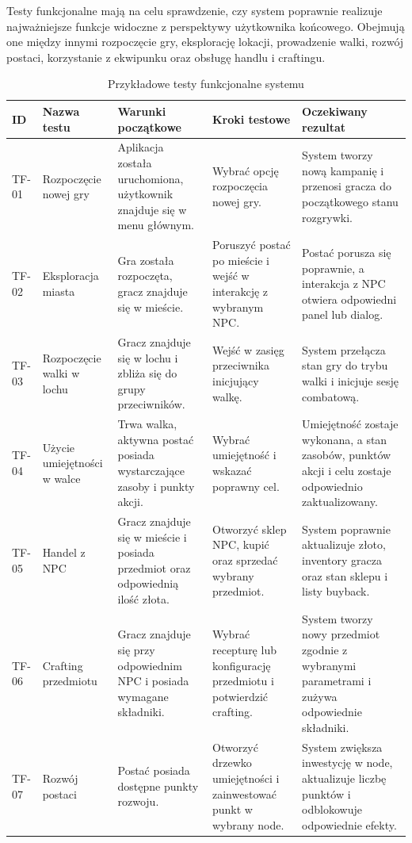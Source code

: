 Testy funkcjonalne mają na celu sprawdzenie, czy system poprawnie realizuje najważniejsze funkcje widoczne z perspektywy użytkownika końcowego. Obejmują one między innymi rozpoczęcie gry, eksplorację lokacji, prowadzenie walki, rozwój postaci, korzystanie z ekwipunku oraz obsługę handlu i craftingu.

\begin{table}[H]
\centering
\caption{Przykładowe testy funkcjonalne systemu}
\label{tab:testy-funkcjonalne}
\begin{threeparttable}
\begin{tabularx}{\linewidth}{|p{1.6cm}|p{3.2cm}|X|X|X|}
\hline
\textbf{ID} & \textbf{Nazwa testu} & \textbf{Warunki początkowe} & \textbf{Kroki testowe} & \textbf{Oczekiwany rezultat} \\
\hline
TF-01 & Rozpoczęcie nowej gry & Aplikacja została uruchomiona, użytkownik znajduje się w menu głównym. & Wybrać opcję rozpoczęcia nowej gry. & System tworzy nową kampanię i przenosi gracza do początkowego stanu rozgrywki. \\
\hline
TF-02 & Eksploracja miasta & Gra została rozpoczęta, gracz znajduje się w mieście. & Poruszyć postać po mieście i wejść w interakcję z wybranym NPC. & Postać porusza się poprawnie, a interakcja z NPC otwiera odpowiedni panel lub dialog. \\
\hline
TF-03 & Rozpoczęcie walki w lochu & Gracz znajduje się w lochu i zbliża się do grupy przeciwników. & Wejść w zasięg przeciwnika inicjujący walkę. & System przełącza stan gry do trybu walki i inicjuje sesję combatową. \\
\hline
TF-04 & Użycie umiejętności w walce & Trwa walka, aktywna postać posiada wystarczające zasoby i punkty akcji. & Wybrać umiejętność i wskazać poprawny cel. & Umiejętność zostaje wykonana, a stan zasobów, punktów akcji i celu zostaje odpowiednio zaktualizowany. \\
\hline
TF-05 & Handel z NPC & Gracz znajduje się w mieście i posiada przedmiot oraz odpowiednią ilość złota. & Otworzyć sklep NPC, kupić oraz sprzedać wybrany przedmiot. & System poprawnie aktualizuje złoto, inventory gracza oraz stan sklepu i listy buyback. \\
\hline
TF-06 & Crafting przedmiotu & Gracz znajduje się przy odpowiednim NPC i posiada wymagane składniki. & Wybrać recepturę lub konfigurację przedmiotu i potwierdzić crafting. & System tworzy nowy przedmiot zgodnie z wybranymi parametrami i zużywa odpowiednie składniki. \\
\hline
TF-07 & Rozwój postaci & Postać posiada dostępne punkty rozwoju. & Otworzyć drzewko umiejętności i zainwestować punkt w wybrany node. & System zwiększa inwestycję w node, aktualizuje liczbę punktów i odblokowuje odpowiednie efekty. \\
\hline
\end{tabularx}
\end{threeparttable}
\end{table}

